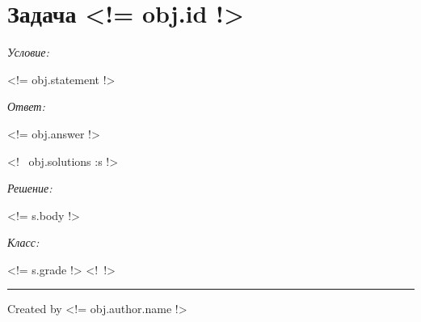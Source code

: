 \documentclass{article}
\newcommand{\tmp}[1]{\noindent\par\textit{#1: }\nopagebreak\par}
\begin{document}
    \section{Задача \textnumero <!= obj.id !>}
    \tmp{Условие}
    <!= obj.statement !>
    \tmp{Ответ}
    <!= obj.answer !>

    <!~ obj.solutions :s !>
        \tmp{Решение}
        <!= s.body !>
        \tmp{Класс}
        <!= s.grade !>
    <!~!>

    \noindent\rule{\textwidth}{0.2pt}
    Created by <!= obj.author.name !>
\end{document}
